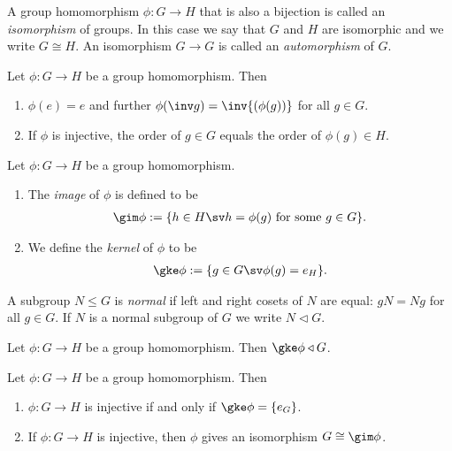 \documentclass{article}
\begin{document}
\begin{definition}
    A group homomorphism $\phi:G\to H$ that is also a bijection is
    called an \emph{isomorphism} of groups. In this case we say that
    $G$ and $H$ are isomorphic and we write $G\cong H$. An
    isomorphism $G\to G$ is called an \emph{automorphism} of $G$.
\end{definition}

\setcounter{theorem}{4}
\begin{lemma}
    Let $\phi:G\to H$ be a group homomorphism. Then
    \begin{enumerate}
        \item $\phi(e)=e$ and further $\phi(\inv g)=\inv{(\phi(g))}$ for all $g\in G$.
        \item If $\phi$ is injective, the order of $g\in G$ equals the order of $\phi(g)\in H$.
    \end{enumerate}
\end{lemma}

\begin{definition}
    Let $\phi:G\to H$ be a group homomorphism.
    \begin{enumerate}
        \item The \emph{image} of $\phi$ is defined to be \begin{align*}
            \gim\phi := \{h\in H \sv h=\phi(g)\text{ for some }g\in G\}.
        \end{align*}
        \item We define the \emph{kernel} of $\phi$ to be \begin{align*}
            \gke \phi := \{g\in G \sv \phi(g) = e_H\}.
        \end{align*}
    \end{enumerate}
\end{definition}

\begin{definition}
    A subgroup $N\leq G$ is \emph{normal} if left and right cosets
    of $N$ are equal: $gN=Ng$ for all $g\in G$. If $N$ is a normal
    subgroup of $G$ we write $N \triangleleft G$.
\end{definition}


\begin{proposition}
    Let $\phi:G\to H$ be a group homomorphism. Then $\gke\phi\triangleleft G$.
\end{proposition}

\begin{proposition}
    Let $\phi: G\to H$ be a group homomorphism. Then
    \begin{enumerate}
        \item $\phi:G\to H$ is injective if and only if $\gke\phi=\{e_G\}$.
        \item If $\phi:G\to H$ is injective, then $\phi$ gives an isomorphism $G\cong \gim\phi$.
    \end{enumerate}
\end{proposition}
\end{document}
